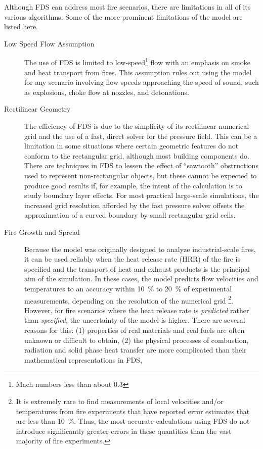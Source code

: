 \documentclass[11pt]{book}
\begin{document}
Although FDS can address most fire scenarios, there are limitations in all of its various algorithms. Some of the more prominent limitations of the
model are listed here.
\begin{description}
\item[Low Speed Flow Assumption] The use of FDS is limited to low-speed\footnote{Mach numbers less than about 0.3} flow
with an emphasis on smoke and heat transport from fires. This assumption rules out using the model for any scenario involving flow speeds approaching
the speed of sound, such as explosions, choke flow at nozzles, and detonations.
\item[Rectilinear Geometry] The efficiency of FDS is due to the simplicity of its rectilinear numerical grid and the
use of a fast, direct solver for the pressure field. This can be a limitation in some situations where certain geometric features do not conform to
the rectangular grid, although most building components do. There are techniques in FDS to lessen the effect of ``sawtooth'' obstructions used to
represent non-rectangular objects, but these cannot be expected to produce good results if, for example, the intent of the calculation is to study
boundary layer effects. For most practical large-scale simulations, the increased grid resolution afforded by the fast pressure solver offsets the
approximation of a curved boundary by small rectangular grid cells.
\item[Fire Growth and Spread]
Because the model was originally designed to analyze industrial-scale fires, it can be used reliably when the heat release rate (HRR) of the fire is
specified and the transport of heat and exhaust products is the principal aim of the simulation. In these cases, the model predicts flow velocities
and temperatures to an accuracy within 10~\% to 20~\% of experimental measurements, depending on the resolution of the numerical grid \footnote{It is
extremely rare to find measurements of local velocities and/or temperatures from fire experiments that have reported error estimates that are less
than 10~\%. Thus, the most accurate calculations using FDS do not introduce significantly greater errors in these quantities than the vast majority
of fire experiments.}. However, for fire scenarios where the heat release rate is {\em predicted} rather than {\em specified}, the uncertainty of the
model is higher. There are several reasons for this: (1) properties of real materials and real fuels are often unknown or difficult to obtain, (2)
the physical processes of combustion, radiation and solid phase heat transfer are more complicated than their mathematical representations in FDS,

\end{description}
\end{document}
